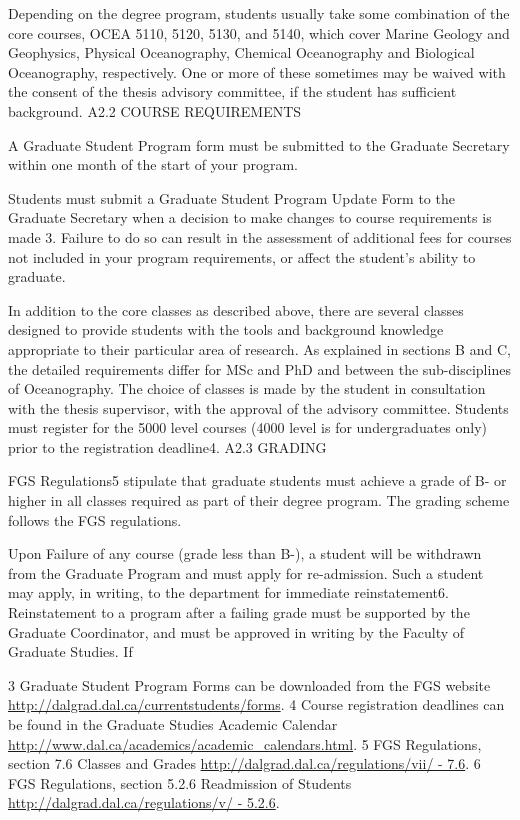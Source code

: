 \documentclass{article}
\newcommand\elink[1]{\url{#1}}
\begin{document}
Depending on the degree program, students usually take some combination of the core courses, OCEA 5110, 5120, 5130, and 5140, which cover Marine Geology and Geophysics, Physical Oceanography, Chemical Oceanography and Biological Oceanography, respectively. One or more of these sometimes may be waived with the consent of the thesis advisory committee, if the student has sufficient background.
A2.2	COURSE REQUIREMENTS

A Graduate Student Program form must be submitted to the Graduate Secretary within one month of the start of your program.

Students must submit a Graduate Student Program Update Form to the Graduate Secretary when a decision to make changes to course requirements is made 3. Failure to do so can result in the assessment of additional fees for courses not included in your program requirements, or affect the student’s ability to graduate.

In addition to the core classes as described above, there are several classes designed to provide students with the tools and background knowledge appropriate to their particular area of research. As explained in sections B and C, the detailed requirements differ for MSc and PhD and between the sub-disciplines of Oceanography. The choice of classes is made by the student in consultation with the thesis supervisor, with the approval of the advisory committee. Students must register for the 5000 level
courses (4000 level is for undergraduates only) prior to the registration deadline4.
A2.3	GRADING

FGS Regulations5 stipulate that graduate students must achieve a grade of B- or higher in all classes required as part of their degree program.  The grading scheme follows the FGS regulations.

Upon Failure of any course (grade less than B-), a student will be withdrawn from the Graduate Program and must apply for re-admission. Such a student may apply, in writing, to the department for immediate reinstatement6. Reinstatement to a program after a failing grade must be supported by the Graduate Coordinator, and must be approved in writing by the Faculty of Graduate Studies. If

3 Graduate Student Program Forms can be downloaded from the FGS website \elink{http://dalgrad.dal.ca/currentstudents/forms}.
4 Course registration deadlines can be found in the Graduate Studies Academic Calendar \elink{http://www.dal.ca/academics/academic_calendars.html}.
5 FGS Regulations, section 7.6 Classes and Grades \elink{http://dalgrad.dal.ca/regulations/vii/ - 7.6}.
6 FGS Regulations, section 5.2.6 Readmission of Students \elink{http://dalgrad.dal.ca/regulations/v/ - 5.2.6}.
 
\end{document}
